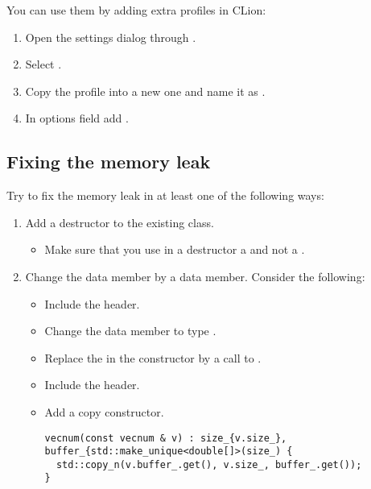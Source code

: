 You can use them by adding extra profiles in CLion:

\begin{enumerate}

\item
Open the settings dialog through .

\item
Select .

\item
Copy the  profile into a new one and name it as .

\item
In options field add .

\end{enumerate}

\subsection{Fixing the memory leak}

Try to fix the memory leak in at least one of the following ways:

\begin{enumerate}

\item Add a destructor to the existing class.
\begin{itemize}
  \item Make sure that you use in a destructor 
        a   
        and not a  .
\end{itemize}

\item Change the  data member by a  data member.
Consider the following:

\begin{itemize}
  \item Include the  header.
  \item Change the  data member to type .
  \item Replace the  in the constructor by a call to .
  \item Include the  header.
  \item Add a copy constructor.
\begin{lstlisting}
vecnum(const vecnum & v) : size_{v.size_}, buffer_{std::make_unique<double[]>(size_) {
  std::copy_n(v.buffer_.get(), v.size_, buffer_.get());
}
\end{lstlisting}
\end{itemize}

\end{enumerate}

